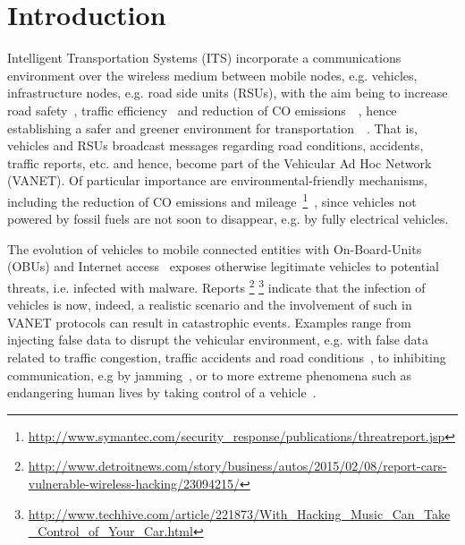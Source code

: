 \documentclass[conference]{IEEEtran}
\begin{document}
\IEEEpeerreviewmaketitle

\section{Introduction}
Intelligent Transportation Systems (ITS) incorporate a communications environment over the wireless medium 
between mobile nodes, e.g. vehicles, infrastructure nodes, e.g. road side units (RSUs), with the aim being to increase road safety~\cite{joerer2014vehicular}, \cite{yang2004vehicle}
traffic efficiency~\cite{mariano2015solution} and reduction of CO emissions~\cite{maglaras2013exploiting}~\cite{santamaria2015safety}, hence establishing a safer and greener environment for 
transportation~\cite{barba2012smart}~\cite{tsugawa2010energy}. That is, vehicles and RSUs broadcast messages regarding road conditions, accidents, traffic reports, etc. and hence, 
become part of the Vehicular Ad Hoc Network (VANET). 
 Of particular importance are environmental-friendly mechanisms, including 
the reduction of CO emissions and mileage~\footnote{\url{http://www.symantec.com/security_response/publications/threatreport.jsp}}~\cite{souza2014decreasing}, since vehicles not powered by fossil fuels are not soon to disappear, e.g. by fully electrical vehicles.



The evolution of vehicles to 
mobile connected entities with On-Board-Units (OBUs) and Internet access~\cite{remy2011lte4v2x} exposes otherwise legitimate vehicles to potential threats, i.e. infected with malware. Reports 
\footnote{\url{http://www.detroitnews.com/story/business/autos/2015/02/08/report-cars-vulnerable-wireless-hacking/23094215/}}
\footnote{\url{http://www.techhive.com/article/221873/With_Hacking_Music_Can_Take_Control_of_Your_Car.html}} indicate that the infection of vehicles is now,
indeed, a realistic scenario and the involvement of such in VANET protocols can result in catastrophic events. Examples range from injecting false data to disrupt
the vehicular environment, e.g. with false data related to traffic congestion, traffic accidents and road conditions~\cite{garip2015congestion}, to inhibiting communication, e.g by jamming~\cite{Punal_2015}, or to  more 
extreme phenomena such as endangering human lives by taking control of a vehicle~\cite{domingo2009safety}.


  
\end{document}
